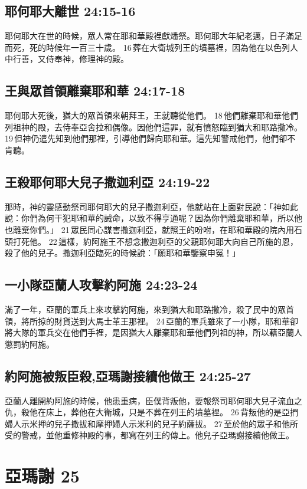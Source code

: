 \subsection{耶何耶大離世 24:15-16}
耶何耶大在世的時候，眾人常在耶和華殿裡獻燔祭。耶何耶大年紀老邁，日子滿足而死，死的時候年一百三十歲。 16 葬在大衛城列王的墳墓裡，因為他在以色列人中行善，又侍奉神，修理神的殿。

\subsection{王與眾首領離棄耶和華 24:17-18}
耶何耶大死後，猶大的眾首領來朝拜王，王就聽從他們。 18 他們離棄耶和華他們列祖神的殿，去侍奉亞舍拉和偶像。因他們這罪，就有憤怒臨到猶大和耶路撒冷。 19 但神仍遣先知到他們那裡，引導他們歸向耶和華。這先知警戒他們，他們卻不肯聽。

\subsection{王殺耶何耶大兒子撒迦利亞 24:19-22}
那時，神的靈感動祭司耶何耶大的兒子撒迦利亞，他就站在上面對民說：「神如此說：你們為何干犯耶和華的誡命，以致不得亨通呢？因為你們離棄耶和華，所以他也離棄你們。」 21 眾民同心謀害撒迦利亞，就照王的吩咐，在耶和華殿的院內用石頭打死他。 22 這樣，約阿施王不想念撒迦利亞的父親耶何耶大向自己所施的恩，殺了他的兒子。撒迦利亞臨死的時候說：「願耶和華鑒察申冤！」

\subsection{一小隊亞蘭人攻擊約阿施 24:23-24}
滿了一年，亞蘭的軍兵上來攻擊約阿施，來到猶大和耶路撒冷，殺了民中的眾首領，將所掠的財貨送到大馬士革王那裡。 24 亞蘭的軍兵雖來了一小隊，耶和華卻將大隊的軍兵交在他們手裡，是因猶大人離棄耶和華他們列祖的神，所以藉亞蘭人懲罰約阿施。

\subsection{約阿施被叛臣殺,亞瑪謝接續他做王 24:25-27}
亞蘭人離開約阿施的時候，他患重病，臣僕背叛他，要報祭司耶何耶大兒子流血之仇，殺他在床上，葬他在大衛城，只是不葬在列王的墳墓裡。 26 背叛他的是亞捫婦人示米押的兒子撒拔和摩押婦人示米利的兒子約薩拔。 27 至於他的眾子和他所受的警戒，並他重修神殿的事，都寫在列王的傳上。他兒子亞瑪謝接續他做王。


\section{亞瑪謝 25 }
